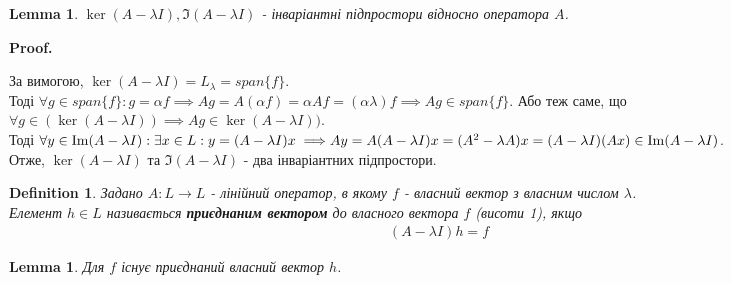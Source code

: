 \documentclass[a4paper, 10pt]{article}
\makeatletter
\theoremstyle{theoremdd}
\newtheorem{definition}[theorem]{Definition}
\newtheorem{lemma}[theorem]{Lemma}
\renewenvironment{proof}[1][Proof.\\]{\par
\pushQED{\hfill \qed}%
\normalfont \topsep6\p@\@plus6\p@\relax
\trivlist
\item\relax
{\bfseries
#1\@addpunct{.}}\hspace\labelsep\ignorespaces
}{%
\popQED\endtrivlist\@endpefalse
}
\makeatother
\begin{document}
\begin{lemma}
$\ker(A - \lambda I), \Im(A-\lambda I)$ - інваріантні підпростори відносно оператора $A$.
\end{lemma}

\begin{proof}
За вимогою, $\ker(A-\lambda I) = L_{\lambda} = span\{f\}$.\\
Тоді $\forall g \in span\{f\}: g = \alpha f \implies Ag = A(\alpha f) = \alpha Af = (\alpha \lambda) f \implies Ag \in span\{f\}$. Або теж саме, що $\forall g \in (\ker(A - \lambda I)) \implies Ag \in  \ker(A - \lambda I))$.
\bigskip \\
Тоді $\forall y \in \Im(A-\lambda I): \exists x \in L: y = (A-\lambda I)x \implies \\ Ay = A(A-\lambda I)x = (A^2-\lambda A)x = (A-\lambda I)(Ax) \in \Im(A-\lambda I)$.\\
Отже, $\ker(A-\lambda I)$ та $\Im(A-\lambda I)$ - два інваріантних підпростори.
\end{proof}

\begin{definition}
Задано $A: L \to L$ - лінійний оператор, в якому $f$ - власний вектор з власним числом $\lambda$.\\
Елемент $h \in L$ називається \textbf{приєднаним вектором} до власного вектора $f$ (висоти 1), якщо
\begin{align*}
(A-\lambda I)h = f
\end{align*}
\end{definition}

\begin{lemma}
Для $f$ існує приєднаний власний вектор $h$.
\end{lemma}
\end{document}
